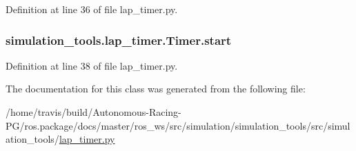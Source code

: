 Definition at line 36 of file lap\+\_\+timer.\+py.

\subsubsection[{\texorpdfstring{start}{start}}]{\setlength{\rightskip}{0pt plus 5cm}simulation\+\_\+tools.\+lap\+\_\+timer.\+Timer.\+start}\hypertarget{classsimulation__tools_1_1lap__timer_1_1_timer_afc51d0e4a6aa0e19be5c8622352b9afe}{}\label{classsimulation__tools_1_1lap__timer_1_1_timer_afc51d0e4a6aa0e19be5c8622352b9afe}


Definition at line 38 of file lap\+\_\+timer.\+py.



The documentation for this class was generated from the following file\+:\begin{DoxyCompactItemize}
\item 
/home/travis/build/\+Autonomous-\/\+Racing-\/\+P\+G/ros.\+package/docs/master/ros\+\_\+ws/src/simulation/simulation\+\_\+tools/src/simulation\+\_\+tools/\hyperlink{lap__timer_8py}{lap\+\_\+timer.\+py}\end{DoxyCompactItemize}
